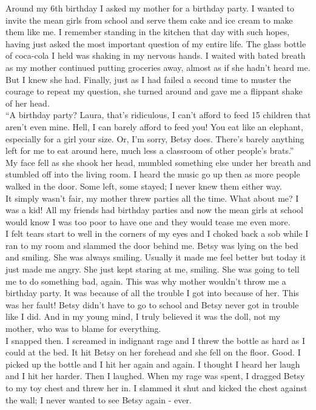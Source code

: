 \documentclass[a5paper]{scrartcl}
\begin{document}
Around my 6th birthday I asked my mother for a birthday party. I wanted to invite the mean girls from school and serve them cake and ice cream to make them like me. I remember standing in the kitchen that day with such hopes, having just asked the most important question of my entire life. The glass bottle of coca-cola I held was shaking in my nervous hands. I waited with bated breath as my mother continued putting groceries away, almost as if she hadn't heard me. But I knew she had. Finally, just as I had failed a second time to muster the courage to repeat my question, she turned around and gave me a flippant shake of her head.\\

\enquote{A birthday party? Laura, that's ridiculous, I can't afford to feed 15 children that aren't even mine. Hell, I can barely afford to feed you! You eat like an elephant, especially for a girl your size. Or, I'm sorry, Betsy does. There's barely anything left for me to eat around here, much less a classroom of other people's brats.}\\

My face fell as she shook her head, mumbled something else under her breath and stumbled off into the living room. I heard the music go up then as more people walked in the door. Some left, some stayed; I never knew them either way. \\

It simply wasn't fair, my mother threw parties all the time. What about me? I was a kid! All my friends had birthday parties and now the mean girls at school would know I was too poor to have one and they would tease me even more.\\

I felt tears start to well in the corners of my eyes and I choked back a sob while I ran to my room and slammed the door behind me. Betsy was lying on the bed and smiling. She was always smiling. Usually it made me feel better but today it just made me angry. She just kept staring at me, smiling. She was going to tell me to do something bad, again. This was why mother wouldn't throw me a birthday party. It was because of all the trouble I got into because of her. This was her fault! Betsy didn't have to go to school and Betsy never got in trouble like I did. And in my young mind, I truly believed it was the doll, not my mother, who was to blame for everything.\\

I snapped then. I screamed in indignant rage and I threw the bottle as hard as I could at the bed. It hit Betsy on her forehead and she fell on the floor. Good. I picked up the bottle and I hit her again and again. I thought I heard her laugh and I hit her harder. Then I laughed. When my rage was spent, I dragged Betsy to my toy chest and threw her in. I slammed it shut and kicked the chest against the wall; I never wanted to see Betsy again - ever.\\
\end{document}
